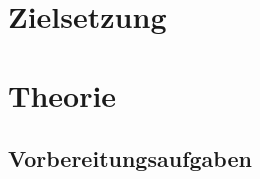 \section{Zielsetzung}
\label{sec:Zielsetzung}

\section{Theorie}
\label{sec:Theorie}

\subsection{Vorbereitungsaufgaben}
\label{sec:Vorbereitungsaufgaben}

